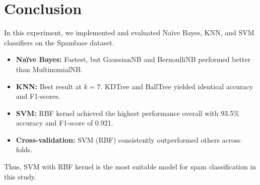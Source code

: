 \documentclass[12pt]{article}
\begin{document}
\section*{Conclusion}
In this experiment, we implemented and evaluated Na\"ive Bayes, KNN, and SVM classifiers on the Spambase dataset.  
\begin{itemize}
\item \textbf{Na\"ive Bayes:} Fastest, but GaussianNB and BernoulliNB performed better than MultinomialNB.  
\item \textbf{KNN:} Best result at \(k=7\). KDTree and BallTree yielded identical accuracy and F1-scores.  
\item \textbf{SVM:} RBF kernel achieved the highest performance overall with 93.5\% accuracy and F1-score of 0.921.  
\item \textbf{Cross-validation:} SVM (RBF) consistently outperformed others across folds.  
\end{itemize}

Thus, SVM with RBF kernel is the most suitable model for spam classification in this study.
\end{document}
